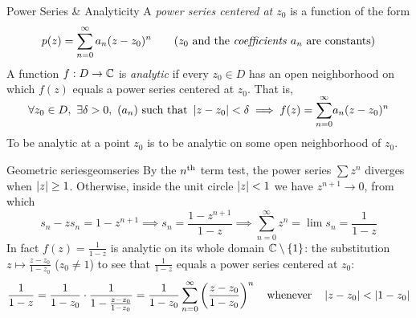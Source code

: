 \goodbreak
% 
%   
%   
%   
 

\begin{defn}{Power Series \& Analyticity}{}
	A \emph{power series centered at $z_0$} is a function of the form
	\[
		p(z)=\sum_{n=0}^\infty a_n(z-z_0)^n \tag{$z_0$ and the \emph{coefficients} $a_n$ are constants}
	\]
	A function $f:D\to\mathbb{C}$ is \emph{analytic} if every $z_0\in D$ has an open neighborhood on which $f(z)$ equals a power series centered at $z_0$. That is,
	\[
		\forall z_0\in D,\ \exists\delta>0,\ (a_n)\text{ such that }\nm{z-z_0}<\delta\implies f(z)=\smash[t]{\sum_{n=0}^\infty} a_n(z-z_0)^n
	\]
	To be analytic at a point $z_0$ is to be analytic on some open neighborhood of $z_0$.
\end{defn}


\begin{example}{Geometric series}{geomseries}
	By the $n\textsuperscript{th}$ term test, the power series $\sum\limits z^n$ diverges when $\left| z\right|\ge 1$. Otherwise, inside the unit circle $\left| z\right|<1$ we have $z^{n+1}\to 0$, from which
	\[
		s_n-zs_n=1-z^{n+1}\implies s_n=\frac{1-z^{n+1}}{1-z} \implies \sum\limits_{n=0}^\infty z^n =\lim s_n=\frac 1{1-z}
	\]
	In fact $f(z)=\frac 1{1-z}$ is analytic on its whole domain $\mathbb{C}\setminus\{1\}$: the substitution $z\mapsto\frac{z-z_0}{1-z_0}$ ($z_0\neq 1$) to see that $\frac 1{1-z}$ equals a power series centered at $z_0$:
	\[
		\frac 1{1-z} =\frac 1{1-z_0}\cdot \frac 1{1-\frac{z-z_0}{1-z_0}}=\frac 1{1-z_0}\sum_{n=0}^\infty \left(\frac{z-z_0}{1-z_0}\right)^n
		\quad\text{whenever}\quad
		\left| z-z_0\right|<\left| 1-z_0\right|
	\]
\end{example}

